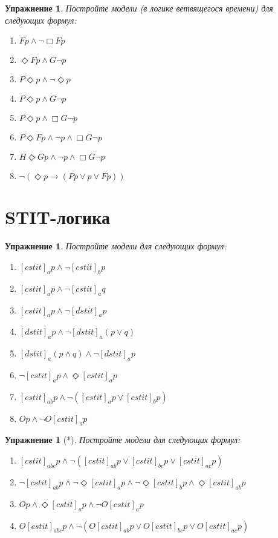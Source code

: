 \documentclass[11pt]{article}
\newtheorem{exercise}[theorem]{Упражнение}
\begin{document}
\begin{exercise} Постройте модели (в логике ветвящегося времени) для следующих формул:
\begin{multicols}{2}
\begin{enumerate}
\item $Fp \wedge \neg \Box Fp$
\item $\Diamond F p \land G \neg p $
\item $ P \Diamond p \land \neg \Diamond p $
\item $ P \Diamond p \land  G \neg p $
\item $ P \Diamond p \land \Box G \neg p $
\item $P \Diamond F p \wedge \neg p \wedge \Box G \neg p $	
\item $H \Diamond G p \wedge \neg p \wedge \Box G \neg p $	
\item $\neg (\Diamond p \to (Pp \vee p \vee Fp))$
\end{enumerate}
\end{multicols}	
\end{exercise}

\section{STIT-логика}
\begin{exercise} Постройте модели для следующих формул:
\begin{enumerate}
	\item $[cstit]_a p \wedge \neg [cstit]_b p$
	\item $[cstit]_a p \wedge \neg [cstit]_a q$
	\item $[cstit]_a p \wedge \neg [dstit]_a p$
	\item $[dstit]_a p \wedge \neg [dstit]_a (p \vee q)$
    \item $[dstit]_a (p \wedge q) \wedge \neg [dstit]_a p$
	\item $\neg [cstit]_a p \wedge \Diamond [cstit]_a p $
    \item $[cstit]_{ab} p \wedge \neg ([cstit]_a p \vee [cstit]_b p) $
    \item $Op \wedge \neg O [cstit]_a p $
\end{enumerate}
\end{exercise}

\begin{exercise}[*]Постройте модели для следующих формул:
\begin{enumerate}
    \item $[cstit]_{abc} p \wedge \neg ([cstit]_{ab} p \vee [cstit]_{bc} p \vee  [cstit]_{ac} p) $
    \item $\neg [cstit]_{ab} p \wedge \neg \Diamond [cstit]_a p \wedge \neg \Diamond [cstit]_b p \wedge \Diamond [cstit]_{ab} p  $
    \item   $Op \wedge \Diamond [cstit]_a p \wedge \neg O[cstit]_a p$
    \item $O [cstit]_{abc} p \wedge \neg (O[cstit]_{ab} p \vee O[cstit]_{bc} p \vee  O[cstit]_{ac} p) $
\end{enumerate}
\end{exercise}
\end{document}
